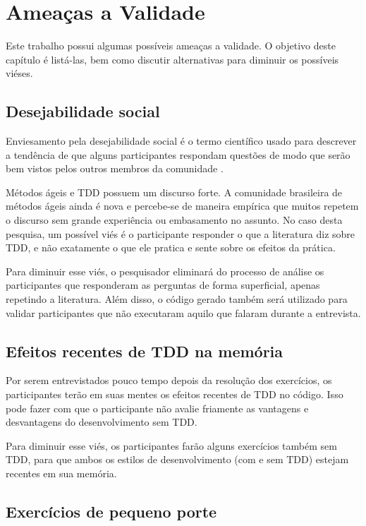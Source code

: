 \chapter{Ameaças a Validade}
\label{cap:ameacas}

Este trabalho possui algumas possíveis ameaças a validade. O objetivo
deste capítulo é listá-las, bem como discutir alternativas para diminuir
os possíveis viéses.

\section{Desejabilidade social}

Enviesamento pela desejabilidade social é o termo científico usado para descrever
a tendência de que alguns participantes respondam questões de modo que serão
bem vistos pelos outros membros da comunidade \cite{crowne}.

Métodos ágeis e TDD possuem um discurso forte. A comunidade brasileira de métodos
ágeis ainda é nova e percebe-se de maneira empírica que muitos repetem o discurso
sem grande experiência ou embasamento no assunto.
No caso desta pesquisa, um possível viés é o participante responder o que
a literatura diz sobre TDD, e não exatamente o que ele pratica e sente sobre
os efeitos da prática. 

Para diminuir esse viés, o pesquisador eliminará do processo de análise os participantes
que responderam as perguntas de forma superficial, apenas repetindo a literatura. Além disso,
o código gerado também será utilizado para validar participantes que não executaram aquilo que
falaram durante a entrevista.

\section{Efeitos recentes de TDD na memória}

Por serem entrevistados pouco tempo depois da resolução dos exercícios, os participantes terão
em suas mentes os efeitos recentes de TDD no código. Isso pode fazer com que o participante
não avalie friamente as vantagens e desvantagens do desenvolvimento sem TDD. 

Para diminuir esse viés, os participantes farão alguns exercícios também
sem TDD, para que ambos os estilos de desenvolvimento (com e sem TDD) estejam
recentes em sua memória.

\section{Exercícios de pequeno porte}

